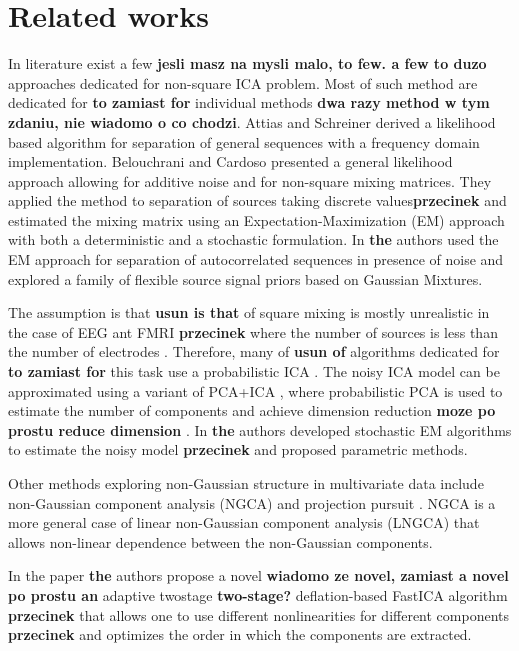 \section{Related works}
\label{related_works}

In literature exist a few \textbf{jesli masz na mysli malo, to few. a few to duzo} approaches dedicated for non-square ICA problem.
Most of such method are dedicated for \textbf{to zamiast for} individual methods \textbf{dwa razy method w tym zdaniu, nie wiadomo o co chodzi}.
Attias and Schreiner \cite{attias1997blind} derived a likelihood based algorithm for separation of general sequences with a frequency domain implementation.
Belouchrani and Cardoso \cite{belouchrani1995maximum} presented a general likelihood approach allowing
for additive noise and for non-square mixing matrices. They applied the
method to separation of sources taking discrete values\textbf{przecinek} and estimated the
mixing matrix using an Expectation-Maximization (EM) approach with both a deterministic and a stochastic formulation. In \cite{moulines1997maximum} \textbf{the} authors used the EM approach
for separation of autocorrelated sequences in presence of noise and explored
a family of flexible source signal priors based on Gaussian Mixtures. 

The assumption is that \textbf{usun is that} of square mixing is mostly unrealistic in  the case of EEG ant FMRI \textbf{przecinek} where the number of sources is less than the number of electrodes \cite{beckmann2004probabilistic,samarov2004nonparametric,shi2017investigating}. Therefore, many of \textbf{usun of} algorithms dedicated for \textbf{to zamiast for} this task use a probabilistic ICA \cite{tipping1999probabilistic}.
The noisy ICA model can be approximated using a variant of PCA+ICA \cite{beckmann2004probabilistic}, where probabilistic PCA is used to estimate the number of components and achieve dimension reduction \textbf{moze po prostu reduce dimension} \cite{tipping1999probabilistic}.
In \cite{allassonniere2012stochastic} \textbf{the} authors developed stochastic EM algorithms to estimate the noisy model \textbf{przecinek} and proposed parametric methods.

Other methods exploring non-Gaussian structure in multivariate data include non-Gaussian component analysis (NGCA) and projection pursuit \cite{blanchard2006search,kawanabe2007new}.
NGCA is a more general case of linear non-Gaussian component analysis (LNGCA) \cite{risk2015likelihood}
that allows non-linear dependence between the non-Gaussian components.

In the paper  \cite{miettinen2014deflation} \textbf{the} authors propose a novel \textbf{wiadomo ze novel, zamiast a novel po prostu an} adaptive twostage \textbf{two-stage?} deflation-based FastICA algorithm \textbf{przecinek} that allows one to use different nonlinearities for different components \textbf{przecinek} and optimizes the order in which the components are extracted.







